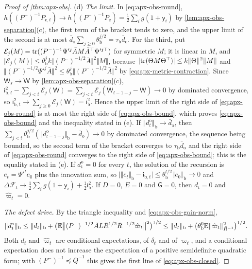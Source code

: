 \begin{proof}[Proof of \cref{thm:apx-obs}]
(d) \emph{The limit.} In \eqref{eq:apx-obs-round}, $h((P^-)^{-1}P_{\mathrm e,t})\to h((P^-)^{-1}P_{\mathrm e})=\frac12\sum_ig(1+\mathsf y_i)$ by \cref{lem:apx-obs-separation}(c), the first term of the bracket tends to zero, and the upper limit of the second is at most $\bar d_{\mathrm o}\sum_{j\ge0}\theta_{\mathrm b}^{j/2}=\tau_{\mathrm b}\bar d_{\mathrm o}$. For the third, put $\mathcal E_j(M)=\operatorname{tr}((P^-)^{-1}\Psi'^j\bar AM\bar A^\top\Psi'^{j\top})$ for symmetric $M$; it is linear in $M$, and $\lvert\mathcal E_j(M)\rvert\le\theta_{\mathrm b}^jk\Vert(P^-)^{-1/2}\bar A\Vert^2\Vert M\Vert$, because $\lvert\operatorname{tr}(\Theta M\Theta^\top)\rvert\le k\Vert\Theta\Vert^2\Vert M\Vert$ and $\Vert(P^-)^{-1/2}\Psi'^j\bar A\Vert^2\le\theta_{\mathrm b}^j\Vert(P^-)^{-1/2}\bar A\Vert^2$ by \cref{eq:apx-metric-contraction}. Since $\mathsf W_s\to\mathsf W$ by \cref{lem:apx-obs-separation}(c), $\mathsf i_{\mathrm b,t}^2-\sum_{j<t}\mathcal E_j(\mathsf W)=\sum_{j<t}\mathcal E_j(\mathsf W_{t-1-j}-\mathsf W)\to0$ by dominated convergence, so $\mathsf i_{\mathrm b,t}^2\to\sum_{j\ge0}\mathcal E_j(\mathsf W)=\mathsf i_{\mathrm b}^2$. Hence the upper limit of the right side of \eqref{eq:apx-obs-round} is at most the right side of \eqref{eq:apx-obs-bound}, which proves \eqref{eq:apx-obs-bound} and the inequality stated in (e). If $\Vert d^{\mathrm o}_t\Vert_{\mathrm b}\to\bar d_{\mathrm o}$, then $\sum_{j<t}\theta_{\mathrm b}^{j/2}(\Vert d^{\mathrm o}_{t-1-j}\Vert_{\mathrm b}-\bar d_{\mathrm o})\to0$ by dominated convergence, the sequence being bounded, so the second term of the bracket converges to $\tau_{\mathrm b}\bar d_{\mathrm o}$ and the right side of \eqref{eq:apx-obs-round} converges to the right side of \eqref{eq:apx-obs-bound}; this is the equality stated in (e). If $d^{\mathrm o}_t=0$ for every $t$, the solution of the recursion is $e_t=\Psi'^te_0$ plus the innovation sum, so $\lvert\Vert e_t\Vert_{\mathrm b}-\mathsf i_{\mathrm b,t}\rvert\le\theta_{\mathrm b}^{t/2}\Vert e_0\Vert_{\mathrm b}\to0$ and $\Delta\mathcal F_t\to\frac12\sum_ig(1+\mathsf y_i)+\frac12\mathsf i_{\mathrm b}^2$. If $D=0$, $E=0$ and $\mathsf G=0$, then $d_t=0$ and $\hat\varpi_t=0$.

\emph{The defect drive.} By the triangle inequality and \eqref{eq:apx-obs-gain-norm},
\begin{equation*}
\Vert d^{\mathrm o}_t\Vert_{\mathrm b}\le\Vert d_t\Vert_{\mathrm b}+\bigl(\mathbb{E}\bigl\Vert(P^-)^{-1/2}\bar AL\bar R^{1/2}\bar R^{-1/2}\hat\varpi_t\bigr\Vert^2\bigr)^{1/2}\le\Vert d_t\Vert_{\mathrm b}+\bigl(\theta^0_{\mathrm b}\mathbb{E}\Vert\hat\varpi_t\Vert^2_{\bar R^{-1}}\bigr)^{1/2} .
\end{equation*}
Both $d_t$ and $\hat\varpi_t$ are conditional expectations, of $\delta_t$ and of $\varpi_t$, and a conditional expectation does not increase the expectation of a positive semidefinite quadratic form; with $(P^-)^{-1}\preceq\bar Q^{-1}$ this gives the first line of \eqref{eq:apx-obs-closed}.


\end{proof}
